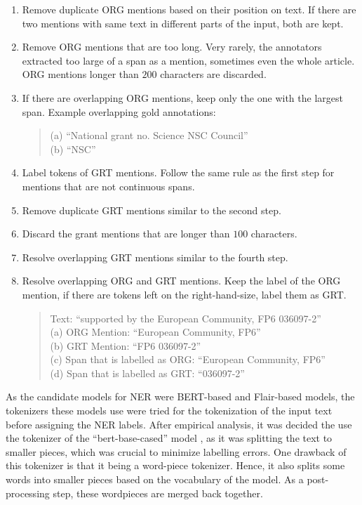 \documentclass{report}
\theoremstyle{definition}
\theoremstyle{remark}
\begin{document}
\begin{enumerate}
    \item Remove duplicate ORG mentions based on their position on text. If there are two mentions with same text in different parts of the input, both are kept.
    \item Remove ORG mentions that are too long. Very rarely, the annotators extracted too large of a span as a mention, sometimes even the whole article. ORG mentions longer than $200$ characters are discarded.
    \item If there are overlapping ORG mentions, keep only the one with the largest span. Example overlapping gold annotations:
    \begin{quote}
        (a) ``National grant no. Science NSC Council'' \\
        (b) ``NSC''
    \end{quote}
    \item Label tokens of GRT mentions. Follow the same rule as the first step for mentions that are not continuous spans.
    \item Remove duplicate GRT mentions similar to the second step.
    \item Discard the grant mentions that are longer than $100$ characters. 
    \item Resolve overlapping GRT mentions similar to the fourth step.
    \item Resolve overlapping ORG and GRT mentions. Keep the label of the ORG mention, if there are tokens left on the right-hand-size, label them as GRT. 
    \begin{quote}
        Text: ``supported by the European Community, FP6 036097-2'' \\
        (a) ORG Mention: ``European Community, FP6'' \\
        (b) GRT Mention: ``FP6 036097-2'' \\
        (c) Span that is labelled as ORG: ``European Community, FP6'' \\
        (d) Span that is labelled as GRT: ``036097-2''
    \end{quote}
\end{enumerate}
    As the candidate models for NER were BERT-based \cite{BERT} and Flair-based \cite{flairpaper} models, the tokenizers these models use were tried for the tokenization of the input text before assigning the NER labels. After empirical analysis, it was decided the use the tokenizer of the ``bert-base-cased'' model \cite{BERT}, as it was splitting the text to smaller pieces, which was crucial to minimize labelling errors. One drawback of this tokenizer is that it being a word-piece tokenizer. Hence, it also splits some words into smaller pieces based on the vocabulary of the model. As a post-processing step, these wordpieces are merged back together.
\end{document}
